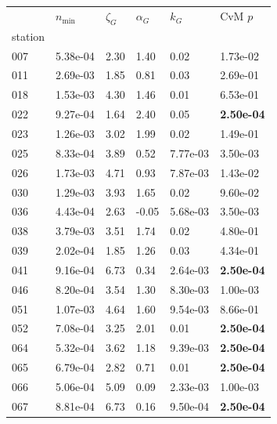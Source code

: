 \begin{figure}[htbp!]
    \centering
    {\footnotesize
    \begin{minipage}[t]{0.48\linewidth}
        \centering
        \begin{tabular}{llllll}
        \toprule
         & $n_{\min}$ & $\zeta_G$ & $\alpha_G$ & $k_G$ & CvM $p$ \\
        station &  &  &  &  &  \\
        \midrule
                    007 & 5.38e-04 & 2.30 & 1.40 & 0.02 & 1.73e-02\\
                    011 & 2.69e-03 & 1.85 & 0.81 & 0.03 & 2.69e-01\\
                    018 & 1.53e-03 & 4.30 & 1.46 & 0.01 & 6.53e-01\\
                    022 & 9.27e-04 & 1.64 & 2.40 & 0.05 & \textbf{2.50e-04}\\
                    023 & 1.26e-03 & 3.02 & 1.99 & 0.02 & 1.49e-01\\
                    025 & 8.33e-04 & 3.89 & 0.52 & 7.77e-03 & 3.50e-03\\
                    026 & 1.73e-03 & 4.71 & 0.93 & 7.87e-03 & 1.43e-02\\
                    030 & 1.29e-03 & 3.93 & 1.65 & 0.02 & 9.60e-02\\
                    036 & 4.43e-04 & 2.63 & -0.05 & 5.68e-03 & 3.50e-03\\
                    038 & 3.79e-03 & 3.51 & 1.74 & 0.02 & 4.80e-01\\
                    039 & 2.02e-04 & 1.85 & 1.26 & 0.03 & 4.34e-01\\
                    041 & 9.16e-04 & 6.73 & 0.34 & 2.64e-03 & \textbf{2.50e-04}\\
                    046 & 8.20e-04 & 3.54 & 1.30 & 8.30e-03 & 1.00e-03\\
                    051 & 1.07e-03 & 4.64 & 1.60 & 9.54e-03 & 8.66e-01\\
                    052 & 7.08e-04 & 3.25 & 2.01 & 0.01 & \textbf{2.50e-04}\\
                    064 & 5.32e-04 & 3.62 & 1.18 & 9.39e-03 & \textbf{2.50e-04}\\
                    065 & 6.79e-04 & 2.82 & 0.71 & 0.01 & \textbf{2.50e-04}\\
                    066 & 5.06e-04 & 5.09 & 0.09 & 2.33e-03 & 1.00e-03\\
                    067 & 8.81e-04 & 6.73 & 0.16 & 9.50e-04 & \textbf{2.50e-04}\\

\end{tabular}
\end{minipage}}
\end{figure}
